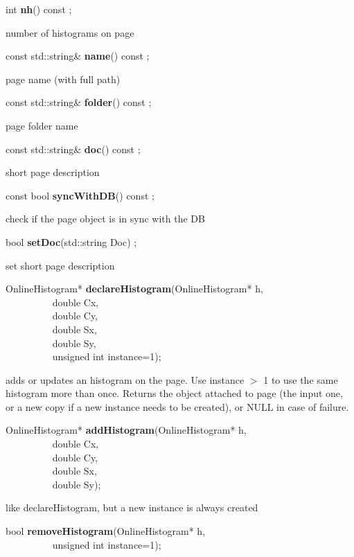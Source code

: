 \item    int {\bf nh}() const ;

 number of histograms on page


\item    const std::string\& {\bf name}() const ;

 page name (with full path)


\item    const std::string\& {\bf folder}() const ;

 page folder name


\item    const std::string\& {\bf doc}() const ;

 short page description


\item    const bool {\bf syncWithDB}() const ;

 check if the page object is in sync with the DB


\item    bool {\bf setDoc}(std::string Doc) ;

 set short page description


\item    OnlineHistogram* {\bf declareHistogram}(OnlineHistogram* h,\\\mbox{}~~~~~~~~~
				    double Cx,\\\mbox{}~~~~~~~~~
				    double Cy,\\\mbox{}~~~~~~~~~
				    double Sx,\\\mbox{}~~~~~~~~~
				    double Sy,\\\mbox{}~~~~~~~~~
				    unsigned int instance=1);

 adds or updates an histogram on the page. Use instance $>$ 1 to use the
 same histogram more than once. Returns the object attached to page (the input
 one, or a new copy if a new instance needs to be created), or NULL in case of failure. 


\item    OnlineHistogram* {\bf addHistogram}(OnlineHistogram* h,\\\mbox{}~~~~~~~~~
				double Cx,\\\mbox{}~~~~~~~~~
				double Cy,\\\mbox{}~~~~~~~~~
				double Sx,\\\mbox{}~~~~~~~~~
				double Sy);

 like declareHistogram, but a new instance is always created


\item    bool {\bf removeHistogram}(OnlineHistogram* h,\\\mbox{}~~~~~~~~~
		       unsigned int instance=1);

